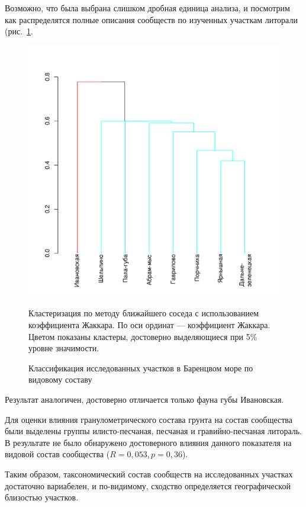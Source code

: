 Возможно, что была выбрана слишком дробная единица анализа, и посмотрим как распределятся полные описания сообществ по изученных участкам литорали (рис.~\ref{ris:cluster_barents_species_sites}. 
	\begin{figure}[p]
		\begin{center}
			\includegraphics{../Barenc_Sea/soobshestvo/Barents_fauna_sites_jaccard_single_1.pdf}
		\end{center}
	\caption{Классификация исследованных участков в Баренцвом море по видовому составу}
	\label{ris:cluster_barents_species_sites}

	\footnotesize{Кластеризация по методу ближайшего соседа с использованием коэффициента Жаккара. По оси ординат --- коэффициент Жаккара. Цветом показаны кластеры, достоверно выделяющиеся при 5\% уровне значимости.}
	\end{figure}
Результат аналогичен, достоверно отличается только фауна губы Ивановская.


Для оценки влияния гранулометрического состава грунта на состав сообщества были выделены группы илисто-песчаная, песчаная и гравийно-песчаная литораль. 
В результате не было обнаружено достоверного влияния данного показателя на видовой состав сообщества ($R=0,053, p=0,36$).
	
Таким образом, таксономический состав сообществ на исследованных участках достаточно вариабелен, и по-видимому, сходство определяется географической близостью участков. 

\afterpage{\clearpage}
